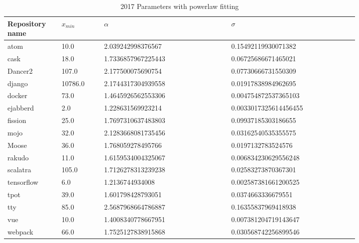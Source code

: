 \documentclass[conference]{IEEEtran}
\begin{document}
\begin{table}[htbp]
	\caption{2017 Parameters with powerlaw fitting}
	\begin{center}
		\begin{tabular}{| p{0.12\linewidth} | p{0.1\linewidth} | p{0.3\linewidth} | p{0.3\linewidth} |}
			\hline
Repository name &$x_{min}$ & $\alpha$ & $\sigma$\\
\hline
atom &10.0 &2.039242998376567  &0.15492119930071382 \\
cask &18.0 &1.7336857967225443  &0.06725686671465021 \\
Dancer2 &107.0 &2.177500075690754  &0.07730666731550309 \\
django &10786.0 &2.1744317304939558  &0.01917838984962695 \\
docker &73.0 &1.4645926562553306  &0.004754872537365103\\
ejabberd &2.0 &1.228631569923214  &0.0033017325614456455 \\
fission &25.0 &1.7697310637483803  &0.09937185303186655 \\
mojo &32.0 &2.1283668081735456  &0.03162540535355575 \\
Moose &36.0 &1.768059278495766  &0.0197132783524576 \\
rakudo &11.0 &1.6159534004325067  &0.006834230629556248 \\
scalatra &105.0 &1.7126278313239238  &0.02583273870367301 \\
tensorflow &6.0 &1.2136744934008  &0.002587381661200525 \\
tpot &39.0 &1.601798428793051 &0.0374663336679551 \\
tty &85.0 &2.5687968664786887  &0.16355837969418938 \\
vue &10.0 &1.4008340778667951  &0.007381204719143647\\
webpack &66.0 &1.7525127838915868 &0.030568742256899546\\ 
			\hline
		\end{tabular}
	\end{center}
\label{tab:2017pars}
\end{table}
\end{document}
